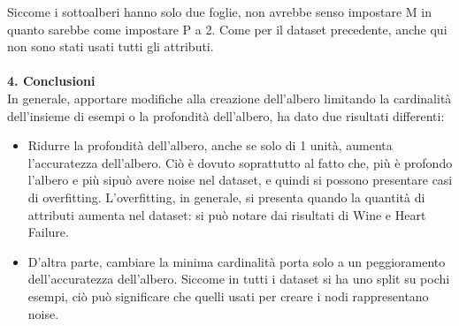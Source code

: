 \documentclass{article}
\begin{document}
\begin{table}[H]
\end{table}
Siccome i sottoalberi hanno solo due foglie, non avrebbe senso impostare M in quanto sarebbe come impostare P a 2.
Come per il dataset precedente, anche qui non sono stati usati tutti gli attributi.\\
\\
{\Large \textbf{{\large{4}}. Conclusioni}}\\
In generale, apportare modifiche alla creazione dell'albero limitando la cardinalità dell'insieme di esempi o la profondità dell'albero, ha dato due risultati differenti:
\begin{itemize}
	\item Ridurre la profondità dell'albero, anche se solo di 1 unità, aumenta l'accuratezza dell'albero. Ciò è dovuto soprattutto al fatto che, più è profondo l'albero e più sipuò avere noise nel dataset, e quindi si possono presentare casi di overfitting. L'overfitting, in generale, si presenta quando la quantità di attributi aumenta nel dataset: si può notare dai risultati di Wine e Heart Failure.
	\item D'altra parte, cambiare la minima cardinalità porta solo a un peggioramento dell'accuratezza dell'albero. Siccome in tutti i dataset si ha uno split su pochi esempi, ciò può significare che quelli usati per creare i nodi rappresentano noise.
\end{itemize}
\end{document}
